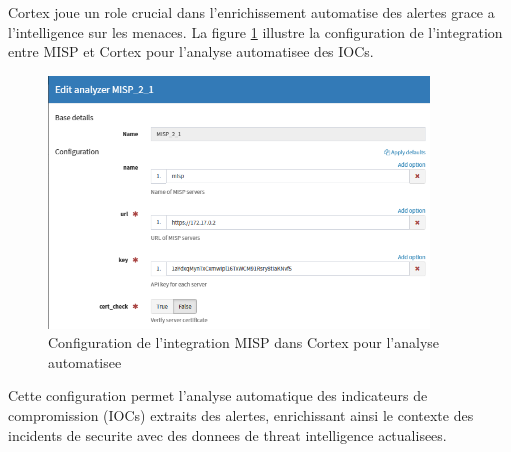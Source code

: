 Cortex joue un role crucial dans l'enrichissement automatise des alertes grace a l'intelligence sur les menaces. La figure \ref{fig:misp_cortex_config} illustre la configuration de l'integration entre MISP et Cortex pour l'analyse automatisee des IOCs.

\begin{figure}[H]
    \centering
    \includegraphics[width=0.9\textwidth]{images/misp_config_in_cortex.png}
    \caption{Configuration de l'integration MISP dans Cortex pour l'analyse automatisee}
    \label{fig:misp_cortex_config}
\end{figure}

Cette configuration permet l'analyse automatique des indicateurs de compromission (IOCs) extraits des alertes, enrichissant ainsi le contexte des incidents de securite avec des donnees de threat intelligence actualisees.

